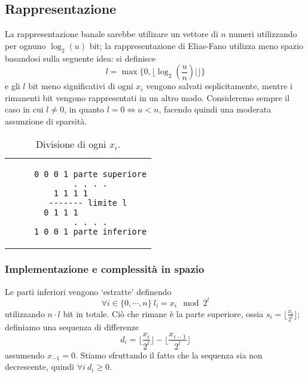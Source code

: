 \subsection{Rappresentazione}
La rappresentazione banale sarebbe utilizare un vettore di $n$ numeri
utilizzando per ognuno $\log_2(u)$ bit; la rappresentazione di Elias-Fano
utilizza meno spazio basandosi sulla seguente idea: si definisce
$$
	l = \max\{0, \lfloor\log_2(\frac{u}{n})|\rfloor\}
$$
e gli $l$ bit meno significativi di ogni $x_i$ vengono salvati
esplicitamente, mentre i rimanenti bit vengono rappresentati
in un altro modo. Consideremo sempre il caso in cui $l\neq 0$, in
quanto $l = 0 \iff u < n$, facendo quindi una moderata
assunzione di sparsità.
\begin{table}[h]
	\centering
	\begin{tabular}{c}
		\begin{lstlisting}
	 0 0 0 1 parte superiore
	 . . . .
	 1 1 1 1 		
	 ------- limite l 
	 0 1 1 1 			
	 . . . .
	 1 0 0 1 parte inferiore
    \end{lstlisting}
	\end{tabular}
	\caption{Divisione di ogni $x_i$.}
\end{table}

\subsubsection{Implementazione e complessità in spazio}
Le parti inferiori vengono `estratte' definendo
$$
	\forall i \in \{0, \cdots, n\} ~ l_i = x_i \mod 2^l
$$
utilizzando $n \cdot l$ bit in totale.  Ciò che rimane è la parte superiore, ossia
$s_i = \lfloor{\frac{x_{i}}{2^l}}\rfloor$; definiamo una sequenza di differenze
$$
	d_i = \lfloor{\frac{x_i}{2^l}}\rfloor - \lfloor{\frac{x_{i-1}}{2^l}}\rfloor
$$
assumendo $x_{-1} = 0$. Stiamo sfruttando il fatto che la sequenza sia non
decrescente, quindi $\forall i ~ d_i \geq 0$.

